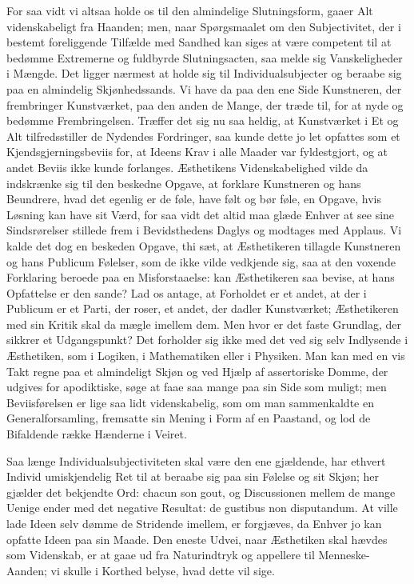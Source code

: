 \documentclass[12pt]{book}
\newcommand{\apage}[1]{\marginnote{\footnotesize\textit{[#1]}}}
\begin{document}
For saa vidt vi altsaa holde os til den almindelige Slutningsform, gaaer Alt
videnskabeligt fra Haanden; men, naar Spørgsmaalet om den Subjectivitet, der i
bestemt foreliggende Tilfælde med Sandhed kan siges at være competent til at
bedømme Extremerne og fuldbyrde Slutningsacten, saa melde sig Vanskeligheder i
Mængde. Det ligger nærmest at holde sig til Individualsubjecter og beraabe sig
paa en almindelig Skjønhedssands. Vi have da paa den ene Side \apage{255} Kunstneren, der
frembringer Kunstværket, paa den anden de Mange, der træde til, for at nyde og
bedømme Frembringelsen. Træffer det sig nu saa heldig, at Kunstværket i Et og
Alt tilfredsstiller de Nydendes Fordringer, saa kunde dette jo let opfattes
som et Kjendsgjerningsbeviis for, at Ideens Krav i alle Maader var
fyldestgjort, og at andet Beviis ikke kunde forlanges. Æsthetikens
Videnskabelighed vilde da indskrænke sig til den beskedne Opgave, at forklare
Kunstneren og hans Beundrere, hvad det egenlig er de føle, have følt og bør
føle, en Opgave, hvis Løsning kan have sit Værd, for saa vidt det altid maa
glæde Enhver at see sine Sindsrørelser stillede frem i Bevidsthedens Daglys og
modtages med Applaus. Vi kalde det dog en beskeden Opgave, thi sæt, at
Æsthetikeren tillagde Kunstneren og hans Publicum Følelser, som de ikke vilde
vedkjende sig, saa at den voxende Forklaring beroede paa en Misforstaaelse:
kan Æsthetikeren saa bevise, at hans Opfattelse er den sande? Lad os antage,
at Forholdet er et andet, at der i Publicum er et Parti, der roser, et andet,
der dadler Kunstværket; Æsthetikeren med sin Kritik skal da mægle imellem dem.
Men hvor er det faste Grundlag, der sikkrer et Udgangspunkt? Det forholder sig
ikke med det ved sig selv Indlysende i Æsthetiken, som i Logiken, i
Mathematiken eller i Physiken. Man kan med en vis Takt regne paa et almindeligt
Skjøn og ved Hjælp af assertoriske Domme, der udgives for apodiktiske, søge at
faae saa mange paa sin Side som muligt; men Beviisførelsen er lige saa lidt
videnskabelig, \apage{256} som om man sammenkaldte en Generalforsamling, fremsatte sin
Mening i Form af en Paastand, og lod de Bifaldende række Hænderne i Veiret.

Saa længe Individualsubjectiviteten skal være den ene gjældende, har ethvert
Individ umiskjendelig Ret til at beraabe sig paa sin Følelse og sit Skjøn; her
gjælder det bekjendte Ord: chacun son gout, og Discussionen mellem de
mange Uenige ender med det negative Resultat: de gustibus non
disputandum. At ville lade Ideen selv dømme de Stridende imellem, er
forgjæves, da Enhver jo kan opfatte Ideen paa sin Maade. Den eneste Udvei, naar
Æsthetiken skal hævdes som Videnskab, er at gaae ud fra Naturindtryk og
appellere til Menneske-Aanden; vi skulle i Korthed belyse, hvad dette vil
sige.
\end{document}
